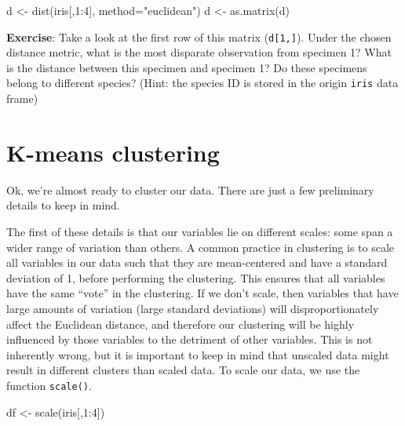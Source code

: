 \documentclass[
]{book}
\newenvironment{Shaded}{\begin{snugshade}}{\end{snugshade}}
\newcommand{\AttributeTok}[1]{\textcolor[rgb]{0.77,0.63,0.00}{#1}}
\newcommand{\DecValTok}[1]{\textcolor[rgb]{0.00,0.00,0.81}{#1}}
\newcommand{\FunctionTok}[1]{\textcolor[rgb]{0.00,0.00,0.00}{#1}}
\newcommand{\NormalTok}[1]{#1}
\newcommand{\OtherTok}[1]{\textcolor[rgb]{0.56,0.35,0.01}{#1}}
\newcommand{\SpecialCharTok}[1]{\textcolor[rgb]{0.00,0.00,0.00}{#1}}
\newcommand{\StringTok}[1]{\textcolor[rgb]{0.31,0.60,0.02}{#1}}
\begin{document}
\begin{Shaded}
\begin{Highlighting}[]
\NormalTok{d }\OtherTok{\textless{}{-}} \FunctionTok{dist}\NormalTok{(iris[,}\DecValTok{1}\SpecialCharTok{:}\DecValTok{4}\NormalTok{], }\AttributeTok{method=}\StringTok{"euclidean"}\NormalTok{)}
\NormalTok{d }\OtherTok{\textless{}{-}} \FunctionTok{as.matrix}\NormalTok{(d)}
\end{Highlighting}
\end{Shaded}

\textbf{Exercise}: Take a look at the first row of this matrix (\texttt{d{[}1,{]}}). Under the chosen distance metric, what is the most disparate observation from specimen 1? What is the distance between this specimen and specimen 1? Do these specimens belong to different species? (Hint: the species ID is stored in the origin \texttt{iris} data frame)

\hypertarget{k-means-clustering}{%
\section{K-means clustering}\label{k-means-clustering}}

Ok, we're almost ready to cluster our data. There are just a few preliminary details to keep in mind.

The first of these details is that our variables lie on different scales: some span a wider range of variation than others. A common practice in clustering is to scale all variables in our data such that they are mean-centered and have a standard deviation of 1, before performing the clustering. This ensures that all variables have the same ``vote'' in the clustering. If we don't scale, then variables that have large amounts of variation (large standard deviations) will disproportionately affect the Euclidean distance, and therefore our clustering will be highly influenced by those variables to the detriment of other variables. This is not inherently wrong, but it is important to keep in mind that unscaled data might result in different clusters than scaled data. To scale our data, we use the function \texttt{scale()}.

\begin{Shaded}
\begin{Highlighting}[]
\NormalTok{df }\OtherTok{\textless{}{-}} \FunctionTok{scale}\NormalTok{(iris[,}\DecValTok{1}\SpecialCharTok{:}\DecValTok{4}\NormalTok{])}
\end{Highlighting}
\end{Shaded}
\end{document}
